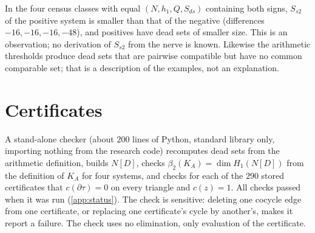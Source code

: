 In the four census classes with equal $(N,h_1,Q,S_{ds})$ containing both signs, $S_{s2}$ of the positive system is smaller than that of the negative (differences $-16,-16,-16,-48$), and positives have dead sets of smaller size. This is an observation; no derivation of $S_{s2}$ from the nerve is known. Likewise the arithmetic thresholds produce dead sets that are pairwise compatible but have no common comparable set; that is a description of the examples, not an explanation.

\section{Certificates}\label{sec:certificates}
A stand-alone checker (about $200$ lines of Python, standard library only, importing nothing from the research code) recomputes dead sets from the arithmetic definition, builds $N[D]$, checks $\beta_2(K_A)=\dim H_1(N[D])$ from the definition of $K_A$ for four systems, and checks for each of the $290$ stored certificates that $c(\partial\tau)=0$ on every triangle and $c(z)=1$. All checks passed when it was run (\cref{app:status}). The check is sensitive: deleting one cocycle edge from one certificate, or replacing one certificate's cycle by another's, makes it report a failure. The check uses no elimination, only evaluation of the certificate.
